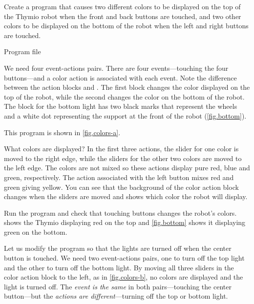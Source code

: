 
\label{ch.colors}


Create a program that causes two different colors to be displayed on the
top of the Thymio robot when the front and back buttons are touched, and
two other colors to be displayed on the bottom of the robot when the
left and right buttons are touched.

{\raggedleft \hfill Program file }

We need four event-actions pairs. There are four events---touching the
four buttons---and a color action is associated with each event. Note
the difference between the action blocks  and
. The first block changes the color displayed
on the top of the robot, while the second changes the color on the
bottom of the robot. The block for the bottom light has two black marks
that represent the wheels and a white dot representing the support at
the front of the robot (\cref{fig.bottom}).

This program is shown in \cref{fig.colors-a}.

What colors are displayed? In the first three actions, the slider for
one color is moved to the right edge, while the sliders for the other
two colors are moved to the left edge. The colors are not mixed so these
actions display pure red, blue and green, respectively. The action
associated with the left button mixes red and green giving yellow. You
can see that the background of the color action block changes when the
sliders are moved and shows which color the robot will display.

Run the program  and check that touching buttons changes the
robot's colors.  shows the Thymio displaying red on the
top and \cref{fig.bottom} shows it displaying green on the bottom.




Let us modify the program so that the lights are turned off when the
center button is touched. We need two event-actions pairs, one to turn
off the top light and the other to turn off the bottom light. By moving
all three sliders in the color action block to the left, as in
\cref{fig.colors-b}, no colors are displayed and the light is turned
off. The \emph{event is the same} in both pairs---touching the center
button---but the \emph{actions are different}---turning off the top or
bottom light.

